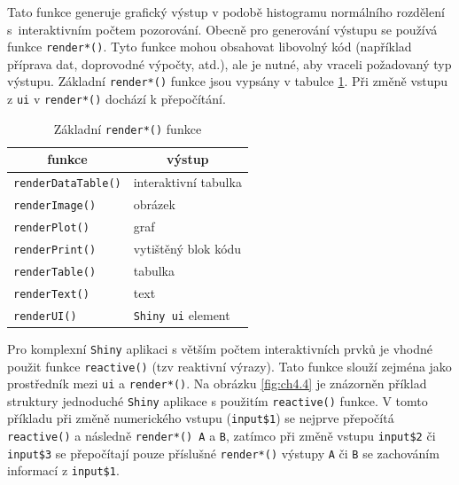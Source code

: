 \documentclass[12pt,]{article}
\newenvironment{Shaded}{\begin{snugshade}}{\end{snugshade}}
\newcommand{\KeywordTok}[1]{\textcolor[rgb]{0.13,0.29,0.53}{\textbf{#1}}}
\newcommand{\DecValTok}[1]{\textcolor[rgb]{0.00,0.00,0.81}{#1}}
\newcommand{\StringTok}[1]{\textcolor[rgb]{0.31,0.60,0.02}{#1}}
\newcommand{\OperatorTok}[1]{\textcolor[rgb]{0.81,0.36,0.00}{\textbf{#1}}}
\newcommand{\NormalTok}[1]{#1}
\begin{document}
\begin{Shaded}
\end{Shaded}

Tato funkce generuje grafický výstup v podobě histogramu normálního
rozdělení s~interaktivním počtem pozorování. Obecně pro generování
výstupu se používá funkce \texttt{render*()}. Tyto funkce mohou
obsahovat libovolný kód (například příprava dat, doprovodné výpočty,
atd.), ale je nutné, aby vraceli požadovaný typ výstupu. Základní
\texttt{render*()} funkce jsou vypsány v tabulce \ref{tab5}. Při změně
vstupu z \texttt{ui} v \texttt{render*()} dochází k přepočítání.

\begin{table}[H]
\centering
\begin{tabular}{|l|l|}
\hline
\multicolumn{1}{|c|}{funkce} & \multicolumn{1}{c|}{výstup} \\ \hline
\texttt{renderDataTable()}   & interaktivní tabulka        \\ \hline
\texttt{renderImage()}       & obrázek                     \\ \hline
\texttt{renderPlot()}        & graf                        \\ \hline
\texttt{renderPrint()}       & vytištěný blok kódu         \\ \hline
\texttt{renderTable()}       & tabulka                     \\ \hline
\texttt{renderText()}        & text                        \\ \hline
\texttt{renderUI()}          & \texttt{Shiny ui} element   \\ \hline
\end{tabular}
\caption{Základní \texttt{render*()} funkce}
\label{tab5}
\end{table}

\vspace*{-0.7cm}

\qquad Pro komplexní \texttt{Shiny} aplikaci s větším počtem
interaktivních prvků je vhodné použit funkce \texttt{reactive()} (tzv
reaktivní výrazy). Tato funkce slouží zejména jako prostředník mezi
\texttt{ui} a \texttt{render*()}. Na obrázku \ref{fig:ch4.4} je
znázorněn příklad struktury jednoduché \texttt{Shiny} aplikace s
použitím \texttt{reactive()} funkce. V tomto příkladu při změně
numerického vstupu (\texttt{input\$1}) se nejprve přepočítá
\texttt{reactive()} a následně \texttt{render*()\ A} a \texttt{B},
zatímco při změně vstupu \texttt{input\$2} či \texttt{input\$3} se
přepočítají pouze příslušné \texttt{render*()} výstupy \texttt{A} či
\texttt{B} se zachováním informací z \texttt{input\$1}.
\vspace*{-0.15cm}
\end{document}
